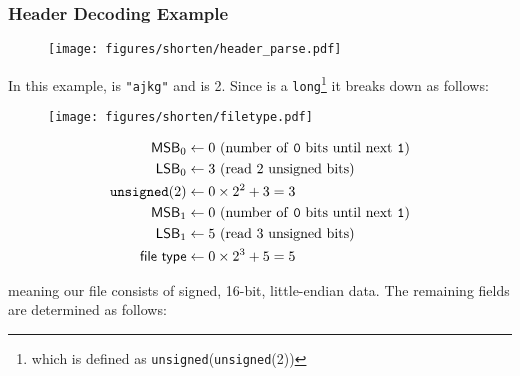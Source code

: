 \clearpage

\subsubsection{Header Decoding Example}

\begin{figure}[h]
  \texttt{[image: figures/shorten/header\_parse.pdf]}
\end{figure}
In this example,  is \texttt{"ajkg"} and
 is 2.
Since  is a \texttt{long}\footnote{which is defined as
  \texttt{unsigned}(\texttt{unsigned}(2))}
it breaks down as follows:
\par
\noindent
\begin{wrapfigure}[3]{r}{140pt}
  \texttt{[image: figures/shorten/filetype.pdf]}
\end{wrapfigure}
{
  \begin{align*}
    \textsf{MSB}_0 &\leftarrow 0
    \text{ (number of \texttt{0} bits until next \texttt{1})} \\
    \textsf{LSB}_0 &\leftarrow 3
    \text{ (read 2 unsigned bits)} \\
    \texttt{unsigned}(2) &\leftarrow 0 \times 2 ^ 2 + 3 = 3 \\
    \textsf{MSB}_1 &\leftarrow 0
    \text{ (number of \texttt{0} bits until next \texttt{1})} \\
    \textsf{LSB}_1 &\leftarrow 5
    \text{ (read 3 unsigned bits)} \\
    \textsf{file type} &\leftarrow 0 \times 2 ^ 3 + 5 = 5 \\
  \end{align*}
}
\par
\noindent
meaning our file consists of signed, 16-bit, little-endian data.
The remaining fields are determined as follows:
